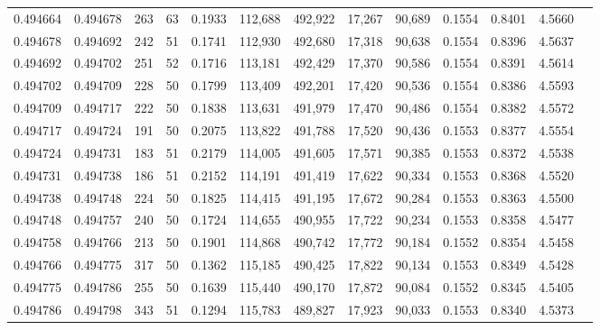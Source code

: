 \begin{tabular}{rrrrrrrrrrrrr}
0.494664 & 0.494678 & 263 &  63 &                                     0.1933 & 112,688 & 492,922 &  17,267 &  90,689 & 0.1554 & 0.8401 & 4.5660 \\
0.494678 & 0.494692 & 242 &  51 &                                     0.1741 & 112,930 & 492,680 &  17,318 &  90,638 & 0.1554 & 0.8396 & 4.5637 \\
0.494692 & 0.494702 & 251 &  52 &                                     0.1716 & 113,181 & 492,429 &  17,370 &  90,586 & 0.1554 & 0.8391 & 4.5614 \\
0.494702 & 0.494709 & 228 &  50 &                                     0.1799 & 113,409 & 492,201 &  17,420 &  90,536 & 0.1554 & 0.8386 & 4.5593 \\
0.494709 & 0.494717 & 222 &  50 &                                     0.1838 & 113,631 & 491,979 &  17,470 &  90,486 & 0.1554 & 0.8382 & 4.5572 \\
0.494717 & 0.494724 & 191 &  50 &                                     0.2075 & 113,822 & 491,788 &  17,520 &  90,436 & 0.1553 & 0.8377 & 4.5554 \\
0.494724 & 0.494731 & 183 &  51 &                                     0.2179 & 114,005 & 491,605 &  17,571 &  90,385 & 0.1553 & 0.8372 & 4.5538 \\
0.494731 & 0.494738 & 186 &  51 &                                     0.2152 & 114,191 & 491,419 &  17,622 &  90,334 & 0.1553 & 0.8368 & 4.5520 \\
0.494738 & 0.494748 & 224 &  50 &                                     0.1825 & 114,415 & 491,195 &  17,672 &  90,284 & 0.1553 & 0.8363 & 4.5500 \\
0.494748 & 0.494757 & 240 &  50 &                                     0.1724 & 114,655 & 490,955 &  17,722 &  90,234 & 0.1553 & 0.8358 & 4.5477 \\
0.494758 & 0.494766 & 213 &  50 &                                     0.1901 & 114,868 & 490,742 &  17,772 &  90,184 & 0.1552 & 0.8354 & 4.5458 \\
0.494766 & 0.494775 & 317 &  50 &                                     0.1362 & 115,185 & 490,425 &  17,822 &  90,134 & 0.1553 & 0.8349 & 4.5428 \\
0.494775 & 0.494786 & 255 &  50 &                                     0.1639 & 115,440 & 490,170 &  17,872 &  90,084 & 0.1552 & 0.8345 & 4.5405 \\
0.494786 & 0.494798 & 343 &  51 &                                     0.1294 & 115,783 & 489,827 &  17,923 &  90,033 & 0.1553 & 0.8340 & 4.5373 \\

\end{tabular}
